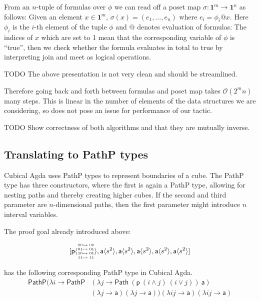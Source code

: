 \documentclass[11pt]{article}
\theoremstyle{definition}
\newtheorem{example}{Example}
\newcommand{\continuation}{??}
\newenvironment{examplecontd}[1]
{\renewcommand{\continuation}{\ref{#1}}\expcont[continued]}
{\endexpcont}
\newcommand{\todo}[1]{
  \begin{tcolorbox}
    TODO {#1} 
  \end{tcolorbox}
}
\newcommand{\mlist}[1]{[ {#1} ]}
\newcommand{\pint}[1]{\mathbf{1}^{#1}}
\newcommand{\smap}[1]{s^{{#1}}}
\newcommand{\cont}[2]{\ensuremath{ \ifthenelse{\equal{#2}{}}{#1}{{#1}\langle{#2}\rangle}} }
\newcommand{\cset}[1]{\ensuremath{\mathsf{{#1}}}}
\newcommand{\substfour}[4]{\tiny
  \arraycolsep=.4pt\def\arraystretch{1}
  \begin{array}{ll}
    00 &\mapsto {#1} \\
    01 &\mapsto {#2} \\
    10 &\mapsto {#3} \\
    11 &\mapsto {#4} 
  \end{array}
}
\begin{document}
From an $n$-tuple of formulas over $\phi$ we can read off a poset map $\sigma :
\pint{m} \to \pint{n}$ as follows: Given an element $x \in \pint{m}$, $\sigma(x) = (e_1
, ... , e_n) $ where $e_i = \phi_i @ x$. Here $\phi_i$ is the $i$-th element of
the tuple $\phi$ and $@$ denotes evaluation of formulas: The indices of $x$
which are set to 1 mean that the corresponding variable of $\phi$ is ``true'',
then we check whether the formula evaluates in total to true by interpreting
join and meet as logical operations.

\todo{The above presentation is not very clean and should be streamlined.}

Therefore going back and forth between formulas and poset map takes
$\mathcal{O}(2^mn)$ many steps. This is linear in the number of elements of the
data structures we are considering, so does not pose an issue for performance of
our tactic.


\todo{Show correctness of both algorithms and that they are mutually inverse.}

\subsection{Translating to PathP types}

Cubical Agda uses PathP types to represent boundaries of a cube. The PathP type
has three constructors, where the first is again a PathP type, allowing for
nesting paths and thereby creating higher cubes. If the second and third
parameter are $n$-dimensional paths, then the first parameter might introduce
$n$ interval variables.


\begin{examplecontd}{exp:sndsphere}
  
The proof goal already introduced above:

$$\mlist{ \cont{\cset{p}}{\substfour{00}{01}{01}{11}} ,
  \cont{\cset{a}}{\smap{2}} , \cont{\cset{a}}{\smap{2}} ,
  \cont{\cset{a}}{\smap{2}} , \cont{\cset{a}}{\smap{2}} ,
  \cont{\cset{a}}{\smap{2}}}$$

has the following corresponding PathP type in Cubical Agda.
  \begin{align*}
    \mathsf{PathP} (\lambda i \to \mathsf{PathP} &(\lambda j \to  \mathsf{Path} \ (\cset{p} \ (i \wedge
                                                   j) \ (i \vee j))\ \cset{a})\\
                                                 &(\lambda j \to \cset{a}) (\lambda j \to \cset{a}))
                                                   (\lambda i j \to \cset{a}) (\lambda i j \to \cset{a})
  \end{align*}
\end{examplecontd}
\end{document}

